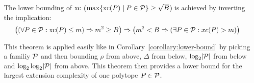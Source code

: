 The lower bounding of $\xc$ ($\max \{\xc(P) \mid P \in \P\}  \geq \sqrt{B}$) is achieved by inverting the implication: 
$$ \left( \left( \forall P\in\P: \xc(P) \leq m \right) \Rightarrow m^2 \geq B \right) \Rightarrow \left( m^2 < B \Rightarrow \left( \exists P\in\P: xc(P) > m \right) \right) $$

This theorem is applied easily like in Corollary~\ref{corollary:lower-bound} by picking a familiy $\P$ and then bounding $\rho$ from above, $\Delta$ from below, $\log_2 \abs{\P}$ from below and $\log_2\log_2 \abs{\P}$ from above. This theorem then provides a lower bound for the largest extension complexity of one polytope $P \in \P$.
